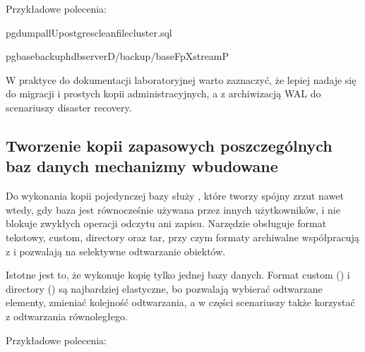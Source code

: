 \documentclass[letterpaper,10pt,polish]{sphinxmanual}
\begin{document}
\sphinxAtStartPar
Przykładowe polecenia:

\begin{sphinxVerbatim}[commandchars=\\\{\}]
pg\PYGZus{}dumpall\PYGZhy{}Upostgres\PYGZhy{}\PYGZhy{}clean\PYGZhy{}\PYGZhy{}filecluster.sql

pg\PYGZus{}basebackup\PYGZhy{}hdbserver\PYGZhy{}D/backup/base\PYGZhy{}Fp\PYGZhy{}Xstream\PYGZhy{}P
\end{sphinxVerbatim}

\sphinxAtStartPar
W praktyce do dokumentacji laboratoryjnej warto zaznaczyć, że  lepiej nadaje się do migracji i prostych kopii administracyjnych, a  z archiwizacją WAL do scenariuszy disaster recovery.


\subsection{Tworzenie kopii zapasowych poszczególnych baz danych \sphinxhyphen{} mechanizmy wbudowane}
\label{\detokenize{rozdzia_u0142_2/rozdzia_u0142_28/index:tworzenie-kopii-zapasowych-poszczegolnych-baz-danych-mechanizmy-wbudowane}}
\sphinxAtStartPar
Do wykonania kopii pojedynczej bazy służy , które tworzy spójny zrzut nawet wtedy, gdy baza jest równocześnie używana przez innych użytkowników, i nie blokuje zwykłych operacji odczytu ani zapisu. Narzędzie obsługuje format tekstowy, custom, directory oraz tar, przy czym formaty archiwalne współpracują z  i pozwalają na selektywne odtwarzanie obiektów.

\sphinxAtStartPar
Istotne jest to, że  wykonuje kopię tylko jednej bazy danych. Format custom () i directory () są najbardziej elastyczne, bo pozwalają wybierać odtwarzane elementy, zmieniać kolejność odtwarzania, a w części scenariuszy także korzystać z odtwarzania równoległego.

\sphinxAtStartPar
Przykładowe polecenia:
\end{document}
